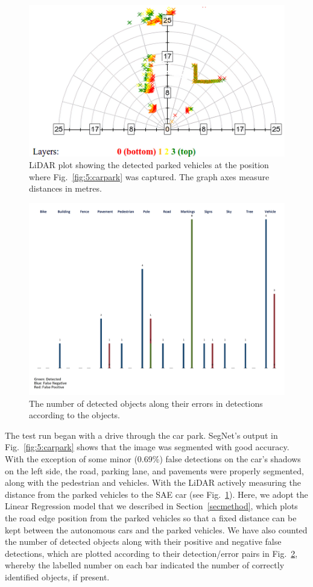 \begin{figure}[H]
	\centering
	\includegraphics[width=0.8\linewidth]{luxplot}
	\caption[LiDAR plot at the position of Fig.~\ref{fig:5:carpark}]{LiDAR plot showing the detected parked vehicles at the position where Fig.~\ref{fig:5:carpark} was captured. The graph axes measure distances in metres.}
	\label{fig:5:lidar}
\end{figure}

\begin{figure}[H]
	\centering
	\includegraphics[width=0.9\linewidth]{figure_2}
	\caption[Detected objects and their errors]{The number of detected objects along their errors in detections according to the objects.}
	\label{fig:5:graph}
\end{figure}

The test run began with a drive through the car park. SegNet's output in Fig.~\ref{fig:5:carpark} shows that the image was segmented with good accuracy. With the exception of some minor (0.69\%)  false detections on the car's shadows on the left side, the road, parking lane, and pavements were properly segmented, along with the pedestrian and vehicles. With the LiDAR actively measuring the distance from the parked vehicles to the SAE car (see Fig.~\ref{fig:5:lidar}). Here, we adopt the Linear Regression model that we described in Section~\ref{secmethod}, which plots the road edge position from the parked vehicles so that a fixed distance can be kept between the autonomous cars and the parked vehicles. We have also counted the number of detected objects along with their positive and negative false detections, which are plotted according to their detection/error pairs in Fig.~\ref{fig:5:graph}, whereby the labelled number on each bar indicated the number of correctly identified objects, if present. 

